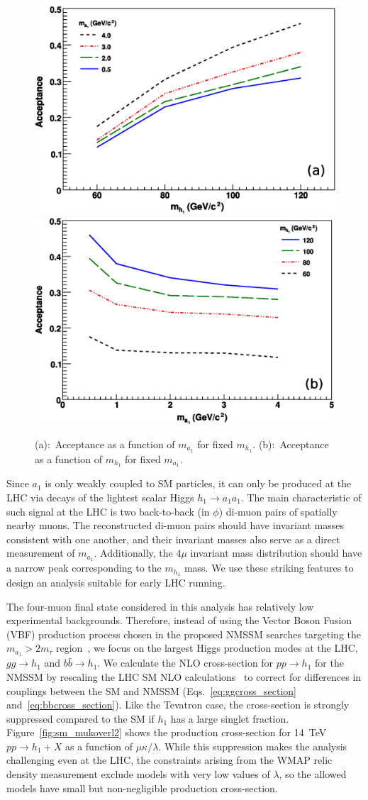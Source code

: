 \documentclass[aps,prl,twocolumn,nofootinbib,superscriptaddress]{revtex4}
\begin{document}
\begin{figure}[htbp]
\begin{center}
\includegraphics[width=0.48\linewidth]{acceptance_vs_mh}
\hfill
\includegraphics[width=0.48\linewidth]{acceptance_vs_ma}

\caption{(a):~Acceptance as a function of $m_{a_1}$ for fixed
  $m_{h_1}$.  (b):~Acceptance as a function of $m_{h_1}$ for fixed
  $m_{a_1}$.}
\label{signal_acceptance}
\end{center}
\end{figure}

Since $a_1$ is only weakly coupled to SM particles, it can only be
produced at the LHC via decays of the lightest scalar Higgs $h_1 \to
a_1 a_1$.  The main characteristic of such signal at the LHC is two
back-to-back (in $\phi$) di-muon pairs of spatially nearby muons.  The
reconstructed di-muon pairs should have invariant masses consistent
with one another, and their invariant masses also serve as a direct
measurement of $m_{a_1}$.  Additionally, the $4\mu$ invariant mass
distribution should have a narrow peak corresponding to the $m_{h_1}$
mass.  We use these striking features to design an analysis suitable
for early LHC running.

The four-muon final state considered in this analysis has relatively
low experimental backgrounds.  Therefore, instead of using the Vector
Boson Fusion (VBF) production process chosen in the proposed NMSSM
searches targeting the $m_{a_1} > 2m_\tau$ region~\cite{nmssm-ph7}, we
focus on the largest Higgs production modes at the LHC, $gg \to h_1$
and $b\bar{b} \to h_1$.  We calculate the NLO cross-section for $pp
\to h_1$ for the NMSSM by rescaling the LHC SM NLO
calculations~\cite{Spira:1995rr,Balazs:1998sb} to correct for
differences in couplings between the SM and NMSSM
(Eqs.~\ref{eq:ggcross_section} and~\ref{eq:bbcross_section}).  Like
the Tevatron case, the cross-section is strongly suppressed compared
to the SM if $h_1$ has a large singlet fraction.
Figure~\ref{fig:sm_mukoverl2} shows the production cross-section for
14~TeV $pp \to h_1+X$ as a function of $\mu\kappa/\lambda$.  While
this suppression makes the analysis challenging even at the LHC, the
constraints arising from the WMAP relic density measurement exclude
models with very low values of $\lambda$, so the allowed models have
small but non-negligible production cross-section.
\end{document}
